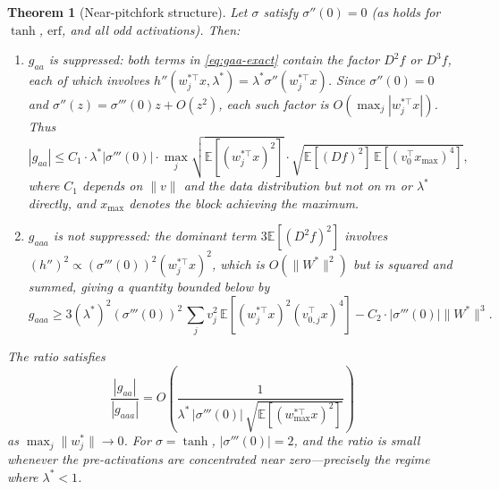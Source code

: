 \documentclass[10pt,a4paper]{amsart}
\newtheorem{theorem}{Theorem}
\begin{document}
\begin{theorem}[Near-pitchfork structure]\label{thm:near-pitchfork-structure}
Let $\sigma$ satisfy $\sigma''(0)=0$ (as holds for $\tanh$, $\mathrm{erf}$, and all odd activations).  Then:
\begin{enumerate}[label=(\roman*)]
\item $g_{aa}$ is suppressed: both terms in \eqref{eq:gaa-exact} contain the factor $D^2f$ or $D^3f$, each of which involves $h''(w_j^{*\top}x,\lambda^*)=\lambda^*\sigma''(w_j^{*\top}x)$.  Since $\sigma''(0)=0$ and $\sigma''(z)=\sigma'''(0)z+O(z^2)$, each such factor is $O(\max_j|w_j^{*\top}x|)$. Thus
\begin{equation}\label{eq:gaa-suppression}
  |g_{aa}|\le C_1\cdot\lambda^*|\sigma'''(0)|\cdot\max_j\!\sqrt{\mathbb E[(w_j^{*\top}x)^2]}\cdot\sqrt{\mathbb E[(Df)^2]\,\mathbb E[(v_0^{\top}x_{\max})^4]},
\end{equation}
where $C_1$ depends on $\|v\|$ and the data distribution but not on $m$ or $\lambda^*$ directly, and $x_{\max}$ denotes the block achieving the maximum.

\item $g_{aaa}$ is not suppressed: the dominant term $3\mathbb E[(D^2f)^2]$ involves $(h'')^2\propto (\sigma'''(0))^2(w_j^{*\top}x)^2$, which is $O(\|W^*\|^2)$ but is squared and summed, giving a quantity bounded below by
\begin{equation}\label{eq:gaaa-lower}
  g_{aaa}\ge 3(\lambda^*)^2(\sigma'''(0))^2\,\sum_j v_j^2\,\mathbb E\!\left[(w_j^{*\top}x)^2(v_{0,j}^\top x)^4\right]-C_2\cdot|\sigma'''(0)|\|W^*\|^3.
\end{equation}
\end{enumerate}

The ratio satisfies
\begin{equation}\label{eq:ratio-explicit}
  \frac{|g_{aa}|}{|g_{aaa}|} = O\!\left(\frac{1}{\lambda^*\,|\sigma'''(0)|\,\sqrt{\mathbb E[(w_{\max}^{*\top}x)^2]}}\right)
\end{equation}
as $\max_j\|w_j^*\|\to 0$. For $\sigma=\tanh$, $|\sigma'''(0)|=2$, and the ratio is small whenever the pre-activations are concentrated near zero---precisely the regime where $\lambda^*<1$.
\end{theorem}
\end{document}
